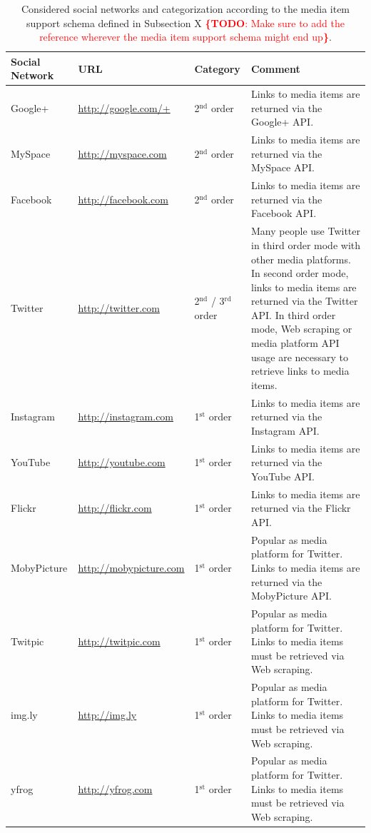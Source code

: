 \documentclass{acm_proc_article-sp}
\newcommand{\todo}[1]{\noindent\textcolor{red}{{\bf \{TODO}: #1{\bf \}}}}
\newcommand{\superscript}[1]{\ensuremath{^{\textrm{#1}}}}
\newcommand{\st}[0]{\superscript{st}}
\newcommand{\nd}[0]{\superscript{nd}}
\newcommand{\rd}[0]{\superscript{rd}}
\newcommand{\inlinelistingsize}{\fontsize{8pt}{11pt}}
\let\oldurl\url
\renewcommand{\url}[1]{\inlinelistingsize\oldurl{#1}}
\begin{document}
\begin{table}[htbp]
  \begin{tabular}{ | l | l | l | p{8cm} |}
    \hline
    \textbf{Social Network} & \textbf{URL} & \textbf{Category} & \textbf{Comment}\\
    \hline
	Google+ & \url{http://google.com/+} & 2{\nd} order & Links to media items are returned via the Google+ API.\\\hline
	MySpace & \url{http://myspace.com} & 2{\nd} order & Links to media items are returned via the MySpace API.\\\hline
	Facebook & \url{http://facebook.com} & 2{\nd} order & Links to media items are returned via the Facebook API.\\\hline
	Twitter & \url{http://twitter.com} & 2{\nd} / 3{\rd} order & Many people use Twitter in third order mode with other media platforms. In second order mode, links to media items are returned via the Twitter API. In third order mode, Web scraping or media platform API usage are necessary to retrieve links to media items.\\\hline
	Instagram & \url{http://instagram.com} & 1{\st} order & Links to media items are returned via the Instagram API.\\\hline
	YouTube & \url{http://youtube.com} & 1{\st} order & Links to media items are returned via the YouTube API.\\\hline
	Flickr & \url{http://flickr.com} & 1{\st} order & Links to media items are returned via the Flickr API.\\\hline
	MobyPicture & \url{http://mobypicture.com} & 1{\st} order & Popular as media platform for Twitter. Links to media items are returned via the MobyPicture API.\\\hline
	Twitpic & \url{http://twitpic.com} & 1{\st} order & Popular as media platform for Twitter. Links to media items must be retrieved via Web scraping.\\\hline
	img.ly & \url{http://img.ly} & 1{\st} order & Popular as media platform for Twitter. Links to media items must be retrieved via Web scraping.\\\hline
	yfrog & \url{http://yfrog.com} & 1{\st} order & Popular as media platform for Twitter.   Links to media items must be retrieved via Web scraping.\\
	\hline
  \end{tabular}
  \label{tab:networks}
  \caption{Considered social networks and categorization according to the media item support schema defined in Subsection X \todo{Make sure to add the reference wherever the media item support schema might end up}.}
\end{table}
\end{document}
